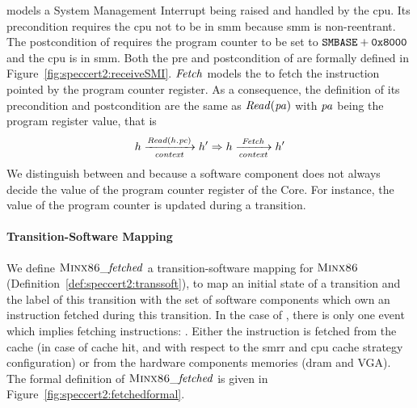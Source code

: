  models a System Management Interrupt being raised and handled
by the \ac{cpu}.
%
Its precondition requires the \ac{cpu} not to be in \ac{smm} because \ac{smm} is
non-reentrant.
%
The postcondition of  requires the program counter to be set to
$\texttt{SMBASE} + \mathtt{0x8000}$ and the \ac{cpu} is in \ac{smm}.
%
Both the pre and postcondition of  are formally defined in
Figure~\ref{fig:speccert2:receiveSMI}.
%
$\mathit{Fetch}$ models the \IO to fetch the instruction pointed by the program
counter register.
%
As a consequence, the definition of its precondition and postcondition are the
same as $\mathit{Read}(\mathit{pa})$ with $\mathit{pa}$ being the program register
value, that is
%
\[
  h \xrightarrow[\mathit{context}]{\mathit{Read}(h.\mathit{pc})} h' \Rightarrow h
  \xrightarrow[\mathit{context}]{\mathit{Fetch}} h'
\]
%
%
We distinguish between  and  because a software component
does not always decide the value of the program counter register of the Core.
%
%
For instance, the value of the program counter is updated during a
 transition.

\paragraph{Transition-Software Mapping}
%
We define \(\textsc{Minx86}\mathit{\_fetched}\) a transition-software mapping for
$\textsc{Minx86}$ (Definition~\ref{def:speccert2:transsoft}), to map an
initial state of a transition and the label of this transition with the set of
software components which own an instruction fetched during this transition.
%
In the case of , there is only one event which implies
fetching instructions: .
%
Either the instruction is fetched from the cache (in case of cache hit, and with
respect to the \ac{smrr} and \ac{cpu} cache strategy configuration) or from the
hardware components memories (\ac{dram} and VGA).
%
The formal definition of \(\textsc{Minx86}\mathit{\_fetched}\) is given in
Figure~\ref{fig:speccert2:fetchedformal}.
%

